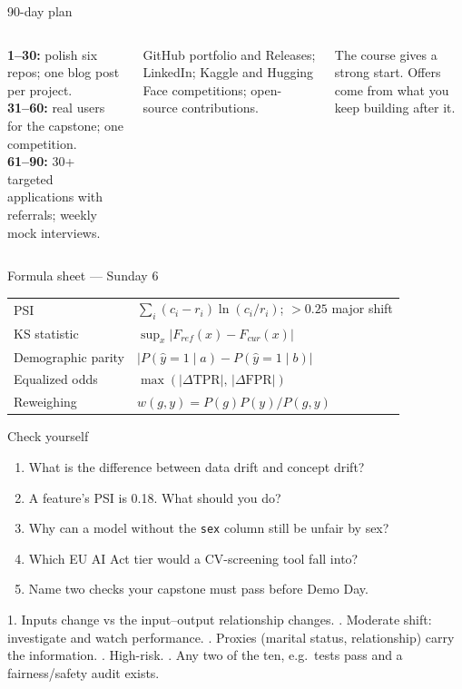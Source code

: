 \documentclass[aspectratio=169,11pt]{beamer}
\begin{document}
\begin{frame}{90-day plan}
\begin{columns}[T]
\begin{bex}[Days 1--90]
\textbf{1--30:} polish six repos; one blog post per project.\\
\textbf{31--60:} real users for the capstone; one competition.\\
\textbf{61--90:} 30+ targeted applications with referrals; weekly mock interviews.
\end{bex}
\begin{bapp}
GitHub portfolio and Releases; LinkedIn; Kaggle and Hugging Face competitions; open-source contributions.
\end{bapp}
\begin{bwarn}
The course gives a strong start. Offers come from what you keep building after it.
\end{bwarn}
\end{columns}
\end{frame}

\begin{frame}{Formula sheet --- Sunday 6}
\renewcommand{\arraystretch}{1.35}
\begin{tabularx}{\linewidth}{l X}
\toprule
PSI & $\sum_i (c_i-r_i)\ln(c_i/r_i)$; \; $>0.25$ major shift\\
KS statistic & $\sup_x|F_{ref}(x)-F_{cur}(x)|$\\
Demographic parity & $|P(\hat y=1\mid a)-P(\hat y=1\mid b)|$\\
Equalized odds & $\max(|\Delta\mathrm{TPR}|,\,|\Delta\mathrm{FPR}|)$\\
Reweighing & $w(g,y)=P(g)P(y)/P(g,y)$\\
\bottomrule
\end{tabularx}
\end{frame}

\begin{frame}{Check yourself}
\begin{enumerate}
\item What is the difference between data drift and concept drift?
\item A feature's PSI is 0.18. What should you do?
\item Why can a model without the \texttt{sex} column still be unfair by sex?
\item Which EU AI Act tier would a CV-screening tool fall into?
\item Name two checks your capstone must pass before Demo Day.
\end{enumerate}
\begin{bex}[Answers]
1. Inputs change vs the input--output relationship changes. . Moderate shift: investigate and watch performance. . Proxies (marital status, relationship) carry the information. . High-risk. . Any two of the ten, e.g.\ tests pass and a fairness/safety audit exists.
\end{bex}
\end{frame}
\end{document}
